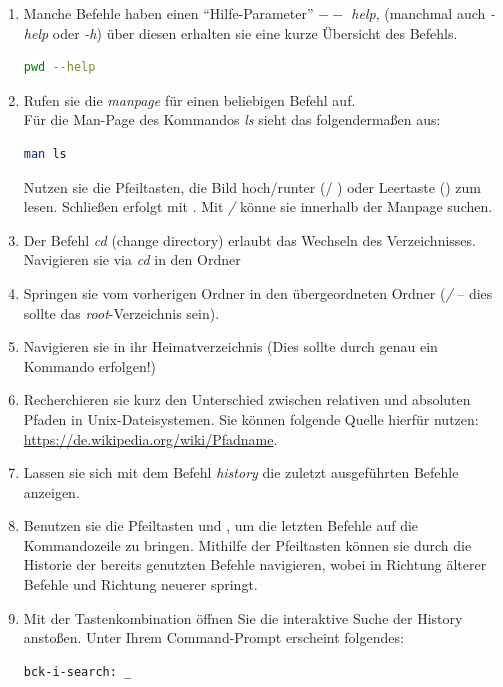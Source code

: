 \documentclass[paper=a4,fontsize=11pt]{scrartcl}%
\numberwithin{equation}{section}
\begin{document}
\begin{enumerate}
\begin{enumerate}[label=(\alph*)]
		\item Manche Befehle haben einen \enquote{Hilfe-Parameter} \emph{$--$ help}, (manchmal auch \emph{-help} oder \emph{-h}) über diesen erhalten sie eine kurze Übersicht des Befehls.
				\begin{lstlisting}[style=Bash, language=Bash]
pwd --help
		\end{lstlisting}
    \item Rufen sie die \emph{manpage} für einen beliebigen Befehl auf.\\
    Für die Man-Page des Kommandos \emph{ls} sieht das folgendermaßen aus:
\begin{lstlisting}[style=Bash, language=Bash]
man ls
		\end{lstlisting}
		 Nutzen sie die Pfeiltasten, die Bild hoch/runter (/ ) oder Leertaste (\keys{\Space}) zum lesen. Schließen erfolgt mit . Mit \emph{/} könne sie innerhalb der Manpage suchen.
		\item Der Befehl \emph{cd} (change directory) erlaubt das Wechseln des Verzeichnisses. Navigieren sie via \emph{cd} in den Ordner 
		\item Springen sie vom vorherigen Ordner in den übergeordneten Ordner (\emph{/} -- dies sollte das \emph{root}-Verzeichnis sein).
		\item Navigieren sie in ihr Heimatverzeichnis (Dies sollte durch genau ein Kommando erfolgen!)
		\item Recherchieren sie kurz den Unterschied zwischen relativen und absoluten Pfaden in Unix-Dateisystemen. Sie können folgende Quelle hierfür nutzen: \url{https://de.wikipedia.org/wiki/Pfadname}.
		\item Lassen sie sich mit dem Befehl \emph{history} die zuletzt ausgeführten Befehle anzeigen. 
		\item Benutzen sie die Pfeiltasten \keys{\arrowkeyup} und \keys{\arrowkeydown}, um die letzten Befehle auf die Kommandozeile zu bringen. Mithilfe der Pfeiltasten können sie durch die Historie der bereits genutzten Befehle navigieren, wobei \keys{\arrowkeyup} in Richtung älterer Befehle und \keys{\arrowkeydown} Richtung neuerer springt.
		\item Mit der Tastenkombination  öffnen Sie die interaktive Suche der History anstoßen. Unter Ihrem Command-Prompt erscheint folgendes:\\
		\begin{lstlisting}[style=Bash, language=Bash]
bck-i-search: _
		\end{lstlisting}

\end{enumerate}
\end{enumerate}
\end{document}
